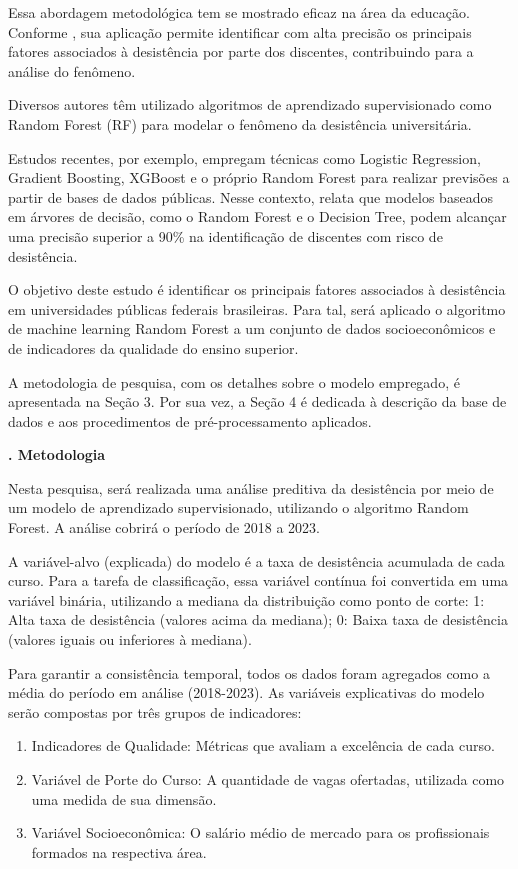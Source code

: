 Essa abordagem metodológica tem se mostrado eficaz na área da educação. Conforme , sua aplicação permite identificar com alta precisão os principais fatores associados à desistência por parte dos discentes, contribuindo para a análise do fenômeno.

Diversos autores têm utilizado algoritmos de aprendizado supervisionado como Random Forest (RF) para modelar o fenômeno da desistência universitária.

Estudos recentes, por exemplo, empregam técnicas como Logistic Regression, Gradient Boosting, XGBoost e o próprio Random Forest para realizar previsões a partir de bases de dados públicas. Nesse contexto,  relata que modelos baseados em árvores de decisão, como o Random Forest e o Decision Tree, podem alcançar uma precisão superior a 90\% na identificação de discentes com risco de desistência.

O objetivo deste estudo é identificar os principais fatores associados à desistência em universidades públicas federais brasileiras. Para tal, será aplicado o algoritmo de machine learning Random Forest a um conjunto de dados socioeconômicos e de indicadores da qualidade do ensino superior.

A metodologia de pesquisa, com os detalhes sobre o modelo empregado, é apresentada na Seção 3. Por sua vez, a Seção 4 é dedicada à descrição da base de dados e aos procedimentos de pré-processamento aplicados.


\vspace{2em}
\noindent\textbf{\themanualchapter. Metodologia}
\vspace{1em}
\par

Nesta pesquisa, será realizada uma análise preditiva da desistência por meio de um modelo de aprendizado supervisionado, utilizando o algoritmo Random Forest. A análise cobrirá o período de 2018 a 2023.

A variável-alvo (explicada) do modelo é a taxa de desistência acumulada de cada curso. Para a tarefa de classificação, essa variável contínua foi convertida em uma variável binária, utilizando a mediana da distribuição como ponto de corte: 1: Alta taxa de desistência (valores acima da mediana); 0: Baixa taxa de desistência (valores iguais ou inferiores à mediana).

Para garantir a consistência temporal, todos os dados foram agregados como a média do período em análise (2018-2023). As variáveis explicativas do modelo serão compostas por três grupos de indicadores:
\begin{enumerate}
    \item Indicadores de Qualidade: Métricas que avaliam a excelência de cada curso.
    \item Variável de Porte do Curso: A quantidade de vagas ofertadas, utilizada como uma medida de sua dimensão.
    \item Variável Socioeconômica: O salário médio de mercado para os profissionais formados na respectiva área.
\end{enumerate}

